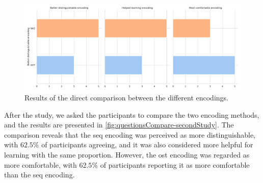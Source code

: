 \begin{table}[ht]
\caption{Results of the \gls{mwu} test for significance grouped by the different self-assessment dimensions with a Cohens d Effect Size.}
\label{table:individualQuestions_significance_secondStudy_nonPara}
\end{table}

\begin{figure}
    \centering
    \includegraphics[width=\linewidth]{src/pictures/Study2Data_questionnaire/questions_compare_study2.pdf}
    \caption{Results of the direct comparison between the different encodings.}
    \label{fig:questionsCompare-secondStudy}
\end{figure}

After the study, we asked the participants to compare the two encoding methods, and the results are presented in \autoref{fig:questionsCompare-secondStudy}.
The comparison reveals that the \gls{seq} encoding was perceived as more distinguishable, with $62.5\%$ of participants agreeing, and it was also considered more helpful for learning with the same proportion.
However, the \gls{ost} encoding was regarded as more comfortable, with $62.5\%$ of participants reporting it as more comfortable than the \gls{seq} encoding.

